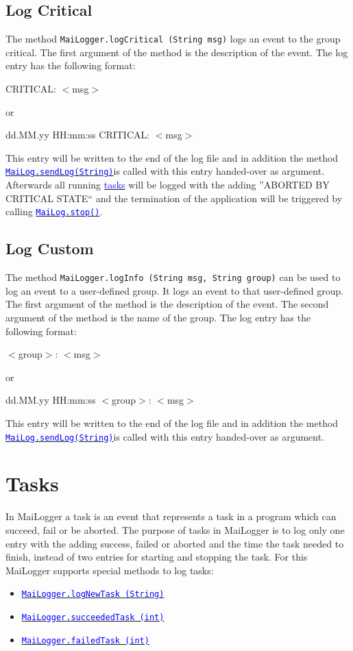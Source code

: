 \documentclass{article}
\newcommand{\refh}[2]{\hyperref[#1] {\textcolor{blue}{#2}}}
\newcommand{\logTask}{\refh{tasks_logTask}{\lstinline|MaiLogger.logNewTask (String)|}}
\newcommand{\succeededTask}{\refh{tasks_succeededTask}{\lstinline|MaiLogger.succeededTask (int)|}}
\newcommand{\failedTask}{\refh{tasks_failedTask}{\lstinline|MaiLogger.failedTask (int)|}}
\newcommand{\sendLog}{\refh{setup_interface}{\lstinline|MaiLog.sendLog(String)|}}
\newcommand{\MaiLogStop}{\refh{setup_interface}{\lstinline|MaiLog.stop()|}}
\begin{document}
    \subsection{Log Critical}
    \label{logging_critical}
    The method \lstinline|MaiLogger.logCritical (String msg)| logs an event to the group critical.
    The first argument of the method is the description of the event.
    The log entry has the following format:
    \begin{description}
        \item CRITICAL: $<$msg$>$
        \item or
        \item dd.MM.yy HH:mm:ss CRITICAL: $<$msg$>$
    \end{description}
    This entry will be written to the end of the log file and in addition the method \sendLog is called with this entry handed-over as argument.
    Afterwards all running \refh{tasks}{tasks} will be logged with the adding ''ABORTED BY CRITICAL STATE`` and the termination of the application will be triggered by calling \MaiLogStop.
    
    \subsection{Log Custom}
    \label{logging_custom}
    The method \lstinline|MaiLogger.logInfo (String msg, String group)| can be used to log an event to a user-defined group.
    It logs an event to that user-defined group.
    The first argument of the method is the description of the event.
    The second argument of the method is the name of the group.
    The log entry has the following format:
    \begin{description}
    	\item $<$group$>$: $<$msg$>$
    	\item or
    	\item dd.MM.yy HH:mm:ss $<$group$>$: $<$msg$>$
    \end{description}
    This entry will be written to the end of the log file and in addition the method \sendLog is called with this entry handed-over as argument.

\section{Tasks}
\label{tasks}
    In MaiLogger a task is an event that represents a task in a program which can succeed, fail or be aborted.
    The purpose of tasks in MaiLogger is to log only one entry with the adding success, failed or aborted and the time the task needed to finish, instead of two entries for starting and stopping the task.
    For this MaiLogger supports special methods to log tasks:
    \begin{itemize}
        \item \logTask
        \item \succeededTask
        \item \failedTask
    \end{itemize}
\end{document}
